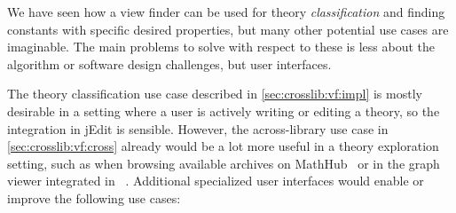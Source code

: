 We have seen how a view finder can be used for theory \emph{classification} and finding constants with specific desired properties, but many other potential use cases are imaginable. The main problems to solve with respect to these is less about the algorithm or software design challenges, but user interfaces.

The theory classification use case described in \autoref{sec:crosslib:vf:impl} is mostly desirable in a setting where a user is actively writing or editing a theory, so the integration in jEdit is sensible. However, the across-library use case in \autoref{sec:crosslib:vf:cross} already would be a lot more useful in a theory exploration setting, such as when browsing available archives on MathHub~\cite{mathhub} or in the graph viewer integrated in \mmt ~\cite{RupKohMue:fitgv17}. Additional specialized user interfaces would enable or improve the following use cases:
